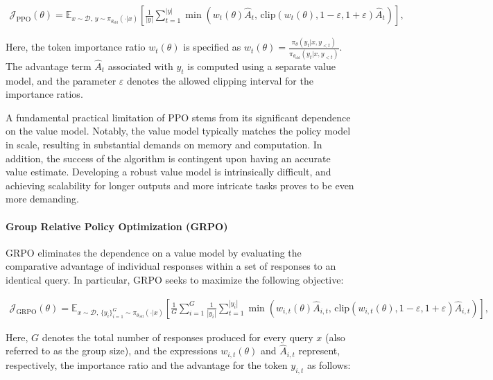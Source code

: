 \begin{align}
\mathcal{J}_\text{PPO}(\theta) = \mathbb{E}_{ x \sim \mathcal{D},\, y \sim \pi_{\theta_\text{old}}( \cdot | x) }
\left[ \frac{1}{|y|} \sum_{t=1}^{|y|} 
\min \left( w_{t}(\theta) \widehat{A}_{t},  \, \mathrm{clip} \left( w_{t}(\theta), 1 - {\varepsilon}, 1 + {\varepsilon}\right) \widehat{A}_{t} \right)
\right],
\end{align}

Here, the token importance ratio $w_{t}(\theta)$ is specified as $
w_{t}(\theta) = \frac{ \pi_{\theta} (y_{t} | x, y_{<t}) }{ \pi_{\theta_\text{old}} (y_{t} | x,y_{<t})} $. The advantage term $\widehat{A}_{t}$ associated with $y_t$ is computed using a separate value model, and the parameter $\varepsilon$ denotes the allowed clipping interval for the importance ratios.

A fundamental practical limitation of PPO stems from its significant dependence on the value model. Notably, the value model typically matches the policy model in scale, resulting in substantial demands on memory and computation. In addition, the success of the algorithm is contingent upon having an accurate value estimate. Developing a robust value model is intrinsically difficult, and achieving scalability for longer outputs and more intricate tasks proves to be even more demanding.

\paragraph{Group Relative Policy Optimization (GRPO)} GRPO \citep{grpo} eliminates the dependence on a value model by evaluating the comparative advantage of individual responses within a set of responses to an identical query. In particular, GRPO seeks to maximize the following objective:

\begin{align}
\label{equ:grpo}
\mathcal{J}_\text{GRPO}(\theta) = \mathbb{E}_{ x \sim \mathcal{D},\, \{y_i\}_{i=1}^G \sim \pi_{\theta_\text{old}}( \cdot | x) }
\left[ \frac{1}{G} \sum_{i=1}^{G} \frac{1}{|y_i|} \sum_{t=1}^{|y_i|} 
\min \left( w_{i,t}(\theta) \widehat{A}_{i,t},  \, \mathrm{clip} \left( w_{i,t}(\theta), 1 - {\varepsilon}, 1 + {\varepsilon}\right) \widehat{A}_{i,t} \right)
\right],
\end{align}

Here, $G$ denotes the total number of responses produced for every query $x$ (also referred to as the group size), and the expressions $w_{i,t}(\theta)$ and $\widehat{A}_{i,t}$ represent, respectively, the importance ratio and the advantage for the token $y_{i,t}$ as follows:


